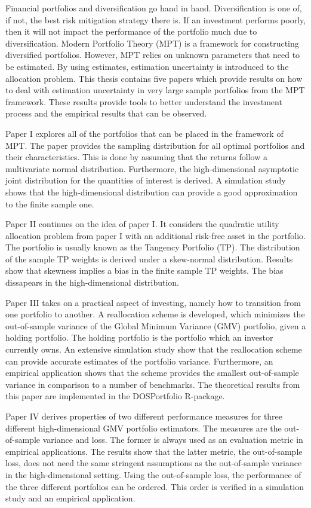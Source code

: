 Financial portfolios and diversification go hand in hand.
Diversification is one of, if not, the best risk mitigation strategy there is.
If an investment performs poorly, then it will not impact the performance of the portfolio much due to diversification.
Modern Portfolio Theory (MPT) is a framework for constructing diversified portfolios.
However, MPT relies on unknown parameters that need to be estimated.
By using estimates, estimation uncertainty is introduced to the allocation problem.
This thesis contains five papers which provide results on how to deal with estimation uncertainty in very large sample portfolios from the MPT framework.
These results provide tools to better understand the investment process and the empirical results that can be observed.

Paper I explores all of the portfolios that can be placed in the framework of MPT. 
The paper provides the sampling distribution for all optimal portfolios and their characteristics.
This is done by assuming that the returns follow a multivariate normal distribution.
Furthermore, the high-dimensional asymptotic joint distribution for the quantities of interest is derived.
A simulation study shows that the high-dimensional distribution can provide a good approximation to the finite sample one.

Paper II continues on the idea of paper I.
It considers the quadratic utility allocation problem from paper I with an additional risk-free asset in the portfolio.
The portfolio is usually known as the Tangency Portfolio (TP).
The distribution of the sample TP weights is derived under a skew-normal distribution.
Results show that skewness implies a bias in the finite sample TP weights.
The bias dissapears in the high-dimensional distribution.

Paper III takes on a practical aspect of investing, namely how to transition from one portfolio to another.
A reallocation scheme is developed, which minimizes the out-of-sample variance of the Global Minimum Variance (GMV) portfolio, given a holding portfolio. 
The holding portfolio is the portfolio which an investor currently owns.
An extensive simulation study show that the reallocation scheme can provide accurate estimates of the portfolio variance.
Furthermore, an empirical application shows that the scheme provides the smallest out-of-sample variance in comparison to a number of benchmarks.
The theoretical results from this paper are implemented in the DOSPortfolio R-package.

Paper IV derives properties of two different performance measures for three different high-dimensional GMV portfolio estimators. 
The measures are the out-of-sample variance and loss.
The former is always used as an evaluation metric in empirical applications.
The results show that the latter metric, the out-of-sample loss, does not need the same stringent assumptions as the out-of-sample variance in the high-dimensional setting.
Using the out-of-sample loss, the performance of the three different portfolios can be ordered.
This order is verified in a simulation study and an empirical application.

